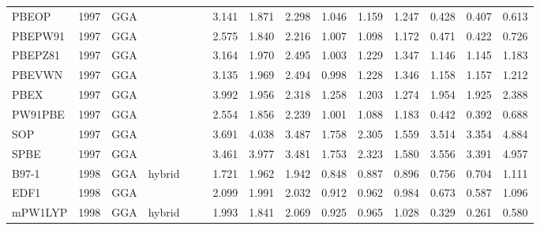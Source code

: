 \begin{landscape}
\begin{longtable}{ll:cccc:rrr:rrr:rrr}
    PBEOP            & 1997 & GGA  &          &             &           & 3.141             & 1.871             & 2.298  & 1.046              & 1.159             & 1.247  & 0.428   & 0.407 & 0.613 \\
    PBEPW91          & 1997 & GGA  &          &             &           & 2.575             & 1.840             & 2.216  & 1.007              & 1.098             & 1.172  & 0.471   & 0.422 & 0.726 \\
    PBEPZ81          & 1997 & GGA  &          &             &           & 3.164             & 1.970             & 2.495  & 1.003              & 1.229             & 1.347  & 1.146   & 1.145 & 1.183 \\
    PBEVWN           & 1997 & GGA  &          &             &           & 3.135             & 1.969             & 2.494  & 0.998              & 1.228             & 1.346  & 1.158   & 1.157 & 1.212 \\
    PBEX             & 1997 & GGA  &          &             &           & 3.992             & 1.956             & 2.318  & 1.258              & 1.203             & 1.274  & 1.954   & 1.925 & 2.388 \\
    PW91PBE          & 1997 & GGA  &          &             &           & 2.554             & 1.856             & 2.239  & 1.001              & 1.088             & 1.183  & 0.442   & 0.392 & 0.688 \\
    SOP              & 1997 & GGA  &          &             &           & 3.691             & 4.038             & 3.487  & 1.758              & 2.305             & 1.559  & 3.514   & 3.354 & 4.884 \\
    SPBE             & 1997 & GGA  &          &             &           & 3.461             & 3.977             & 3.481  & 1.753              & 2.323             & 1.580  & 3.556   & 3.391 & 4.957 \\
    B97-1            & 1998 & GGA  & hybrid   &             &           & 1.721             & 1.962             & 1.942  & 0.848              & 0.887             & 0.896  & 0.756   & 0.704 & 1.111 \\
    EDF1             & 1998 & GGA  &          &             &           & 2.099             & 1.991             & 2.032  & 0.912              & 0.962             & 0.984  & 0.673   & 0.587 & 1.096 \\
    mPW1LYP          & 1998 & GGA  & hybrid   &             &           & 1.993             & 1.841             & 2.069  & 0.925              & 0.965             & 1.028  & 0.329   & 0.261 & 0.580 \\

\end{longtable}
\end{landscape}
